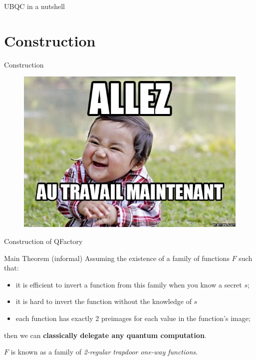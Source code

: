 \documentclass[]{beamer}
\begin{document}
\begin{frame}{UBQC in a nutshell}
  \begin{figure}[ht]
    \centering
  \end{figure}
\end{frame}

\section{Construction}

\begin{frame}{Construction}
    \begin{figure}[ht]
      \centering
      \includegraphics[width=\textwidth,height=0.8\textheight,keepaspectratio]{figures/au_travail.jpg}
    \end{figure}
\end{frame}


\begin{frame}{Construction of QFactory}
  \begin{block}{Main Theorem (informal)}
    Assuming the existence of a family of functions $F$ such that:
    \begin{itemize}
    \item it is efficient to invert a function from this family when you know a secret $s$;
    \item it is hard to invert the function without the knowledge of $s$
    \item each function has exactly 2 preimages for each value in the function's image;
    \end{itemize}
    then we can \textbf{classically delegate any quantum computation}.
  
    $F$ is known as a family of \textit{2-regular trapdoor one-way functions}. \\
    
  \end{block}
\end{frame}
\end{document}
